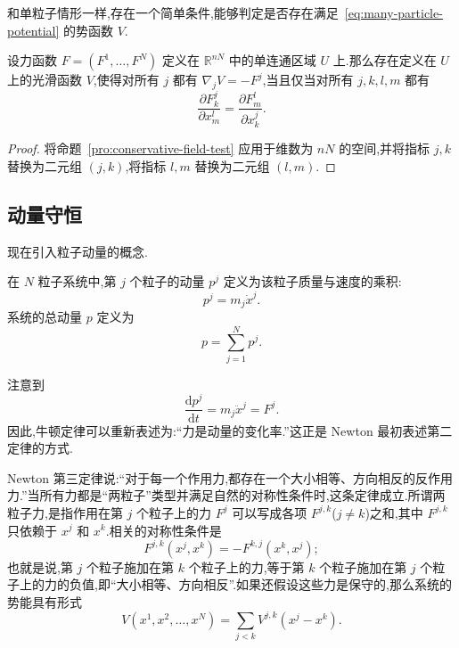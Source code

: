 和单粒子情形一样,存在一个简单条件,能够判定是否存在满足~\eqref{eq:many-particle-potential} 的势函数 $V$.

\begin{proposition}[多粒子势函数的存在性]\label{pro:many-particle-potential-existence}
设力函数 $F=(F^{1},\ldots,F^{N})$ 定义在 $\mathbb{R}^{nN}$ 中的单连通区域 $U$ 上.那么存在定义在 $U$ 上的光滑函数 $V$,使得对所有 $j$ 都有 $\nabla_{j}V=-F^{j}$,当且仅当对所有 $j,k,l,m$ 都有
\begin{equation}
  \frac{\partial F^{j}_{k}}{\partial x^{l}_{m}}
  =\frac{\partial F^{l}_{m}}{\partial x^{j}_{k}}.
  \label{eq:many-particle-potential-test}
\end{equation}
\end{proposition}

\begin{proof}
将命题~\ref{pro:conservative-field-test} 应用于维数为 $nN$ 的空间,并将指标 $j,k$ 替换为二元组 $(j,k)$,将指标 $l,m$ 替换为二元组 $(l,m)$.
\end{proof}

\subsection{动量守恒}\label{subsec:many-particle-potentials}

现在引入粒子动量的概念.

\begin{definition}[动量]\label{def:momentum}
在 $N$ 粒子系统中,第 $j$ 个粒子的动量 $p^{j}$ 定义为该粒子质量与速度的乘积:
\[
  p^{j}=m_{j}\dot{x}^{j}.
\]
系统的总动量 $p$ 定义为
\[
  p=\sum_{j=1}^{N}p^{j}.
\]
\end{definition}

注意到
\[
  \frac{\mathrm{d}p^{j}}{\mathrm{d}t}=m_{j}\ddot{x}^{j}=F^{j}.
\]
因此,牛顿定律可以重新表述为:“力是动量的变化率.”这正是 Newton 最初表述第二定律的方式.

Newton 第三定律说:“对于每一个作用力,都存在一个大小相等、方向相反的反作用力.”当所有力都是“两粒子”类型并满足自然的对称性条件时,这条定律成立.所谓两粒子力,是指作用在第 $j$ 个粒子上的力 $F^{j}$ 可以写成各项 $F^{j,k}$($j\neq k$)之和,其中 $F^{j,k}$ 只依赖于 $x^{j}$ 和 $x^{k}$.相关的对称性条件是
\[
  F^{j,k}(x^{j},x^{k})=-F^{k,j}(x^{k},x^{j});
\]
也就是说,第 $j$ 个粒子施加在第 $k$ 个粒子上的力,等于第 $k$ 个粒子施加在第 $j$ 个粒子上的力的负值,即“大小相等、方向相反”.如果还假设这些力是保守的,那么系统的势能具有形式
\begin{equation}
  V(x^{1},x^{2},\ldots,x^{N})
  =\sum_{j<k}V^{j,k}(x^{j}-x^{k}).
  \label{eq:two-particle-potential}
\end{equation}


